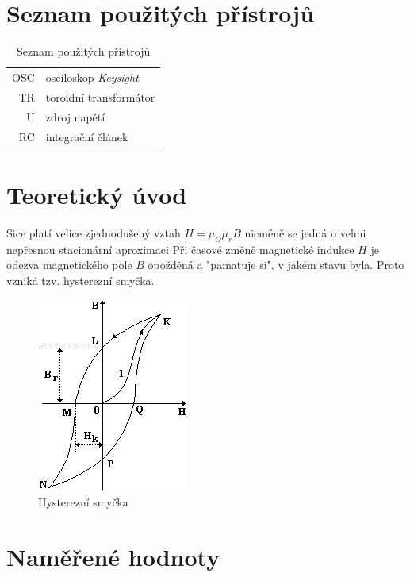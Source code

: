 \documentclass[a4paper,12pt]{article}   %
\begin{document}
\section{Seznam použitých přístrojů}
\label{chap:seznam_pristroju}
\begin{table}
  \begin{center}
    \begin{tabular}{rl}
      OSC & osciloskop \textit{Keysight}\\
      TR & toroidní transformátor\\
      U & zdroj napětí\\
      RC & integrační článek\\
    \end{tabular}
  \end{center}
  \caption{Seznam použitých přístrojů}
\end{table}


\section{Teoretický úvod}
\label{chap:teoreticky_uvod}
Sice platí velice zjednodušený vztah $H=\mu_O\mu_rB$ nicméně se jedná o velmi nepřesnou stacionární aproximaci Při časové změně magnetické indukce $H$ je odezva magnetického pole $B$ opožděná a "pamatuje si", v jakém stavu byla. Proto vzniká tzv. hysterezní smyčka.
\begin{figure}
  \centering
  \includegraphics[width=.3\textwidth]{hyst.png}
  \caption{Hysterezní smyčka}
\end{figure}


\section{Naměřené hodnoty}
\label{chap:namerene_hodnoty}
\end{document}
